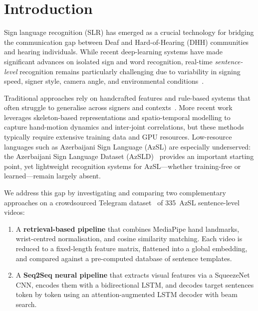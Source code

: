 \documentclass[runningheads]{llncs}
\begin{document}
\section{Introduction}

Sign language recognition (SLR) has emerged as a crucial technology for
bridging the communication gap between Deaf and Hard-of-Hearing (DHH)
communities and hearing individuals.
While recent deep-learning systems have made significant advances on
isolated sign and word recognition, real-time \emph{sentence-level}
recognition remains particularly challenging due to variability in
signing speed, signer style, camera angle, and environmental
conditions~\cite{liu2024skeleton}.

Traditional approaches rely on handcrafted features and rule-based
systems that often struggle to generalise across signers and
contexts~\cite{fang2013bayesian}.
More recent work leverages skeleton-based representations and
spatio-temporal modelling to capture hand-motion dynamics and
inter-joint correlations, but these methods typically require extensive
training data and GPU resources.
Low-resource languages such as Azerbaijani Sign Language (AzSL) are
especially underserved: the Azerbaijani Sign Language Dataset
(AzSLD)~\cite{alishzade2024azsld} provides an important starting
point, yet lightweight recognition systems for AzSL—whether
training-free or learned—remain largely absent.

We address this gap by investigating and comparing two complementary
approaches on a crowdsourced Telegram
dataset~\cite{mustafazada2025crowdsourcing} of 335~AzSL
sentence-level videos:
\begin{enumerate}
    \item A \textbf{retrieval-based pipeline} that combines MediaPipe
          hand landmarks, wrist-centred normalisation, and cosine
          similarity matching.
          Each video is reduced to a fixed-length feature matrix,
          flattened into a global embedding, and compared against a
          pre-computed database of sentence templates.
    \item A \textbf{Seq2Seq neural pipeline} that extracts visual
          features via a SqueezeNet CNN, encodes them with a
          bidirectional LSTM, and decodes target sentences token by
          token using an attention-augmented LSTM decoder with
          beam search.
\end{enumerate}
\end{document}
